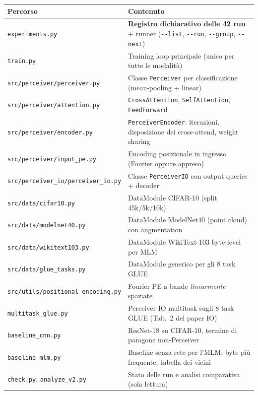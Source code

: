 \documentclass[
  11pt,
]{article}
\begin{document}
\begin{center}
{\small
\begin{tabular}{@{}p{5cm}p{9cm}@{}}
\toprule
\textbf{Percorso} & \textbf{Contenuto} \\
\midrule
\texttt{experiments.py} & \textbf{Registro dichiarativo delle 42 run} + runner (\texttt{-{}-list}, \texttt{-{}-run}, \texttt{-{}-group}, \texttt{-{}-next}) \\
\texttt{train.py} & Training loop principale (unico per tutte le modalità) \\
\texttt{src/perceiver/perceiver.py} & Classe \texttt{Perceiver} per classificazione (mean-pooling + linear) \\
\texttt{src/perceiver/attention.py} & \texttt{CrossAttention}, \texttt{SelfAttention}, \texttt{FeedForward} \\
\texttt{src/perceiver/encoder.py} & \texttt{PerceiverEncoder}: iterazioni, disposizione dei cross-attend, weight sharing \\
\texttt{src/perceiver/input\_pe.py} & Encoding posizionale in ingresso (Fourier oppure appreso) \\
\texttt{src/perceiver\_io/perceiver\_io.py} & Classe \texttt{PerceiverIO} con output queries + decoder \\
\texttt{src/data/cifar10.py} & DataModule CIFAR-10 (split 45k/5k/10k) \\
\texttt{src/data/modelnet40.py} & DataModule ModelNet40 (point cloud) con augmentation \\
\texttt{src/data/wikitext103.py} & DataModule WikiText-103 byte-level per MLM \\
\texttt{src/data/glue\_tasks.py} & DataModule generico per gli 8 task GLUE \\
\texttt{src/utils/positional\_encoding.py} & Fourier PE a bande \emph{linearmente} spaziate \\
\texttt{multitask\_glue.py} & Perceiver IO multitask sugli 8 task GLUE (Tab.~2 del paper IO) \\
\texttt{baseline\_cnn.py} & ResNet-18 su CIFAR-10, termine di paragone non-Perceiver \\
\texttt{baseline\_mlm.py} & Baseline senza rete per l'MLM: byte più frequente, tabella dei vicini \\
\texttt{check.py}, \texttt{analyze\_v2.py} & Stato delle run e analisi comparativa (sola lettura) \\
\bottomrule
\end{tabular}
}
\end{center}
\end{document}
